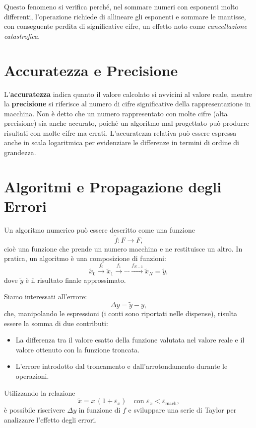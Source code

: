 \documentclass[letterpaper,12pt]{article}
\begin{document}
Questo fenomeno si verifica perché, nel sommare numeri con esponenti molto differenti, l'operazione richiede di allineare gli esponenti e sommare le mantisse, con conseguente perdita di significative cifre, un effetto noto come \emph{cancellazione catastrofica}.

\section*{Accuratezza e Precisione}

L'\textbf{accuratezza} indica quanto il valore calcolato si avvicini al valore reale, mentre la \textbf{precisione} 
si riferisce al numero di cifre significative della rappresentazione in macchina. Non è detto che un numero rappresentato 
con molte cifre (alta precisione) sia anche accurato, poiché un algoritmo mal progettato può produrre risultati con molte 
cifre ma errati. L'accuratezza relativa può essere espressa anche in scala logaritmica per evidenziare le differenze 
in termini di ordine di grandezza.

\section*{Algoritmi e Propagazione degli Errori}

Un algoritmo numerico può essere descritto come una funzione
\[
\tilde{f} : F \to F,
\]
cioè una funzione che prende un numero macchina e ne restituisce un altro. In pratica, un algoritmo è una composizione di funzioni:
\[
\tilde{x}_0 \xrightarrow{f_0} \tilde{x}_1 \xrightarrow{f_1} \cdots \xrightarrow{f_{N-1}} \tilde{x}_N = \tilde{y},
\]
dove $\tilde{y}$ è il risultato finale approssimato.

Siamo interessati all'errore:
\[
\Delta y = \tilde{y} - y,
\]
che, manipolando le espressioni (i conti sono riportati nelle dispense), risulta essere la somma di due contributi:
\begin{itemize}
    \item La differenza tra il valore esatto della funzione valutata nel valore reale e il valore ottenuto con la funzione troncata.
    \item L'errore introdotto dal troncamento e dall'arrotondamento durante le operazioni.
\end{itemize}

Utilizzando la relazione
\[
\tilde{x} = x\,(1+\varepsilon_x) \quad \text{con } \varepsilon_x < \varepsilon_{\text{mach}},
\]
è possibile riscrivere $\Delta y$ in funzione di $f$ e sviluppare una serie di Taylor per analizzare l'effetto degli errori.
\end{document}
